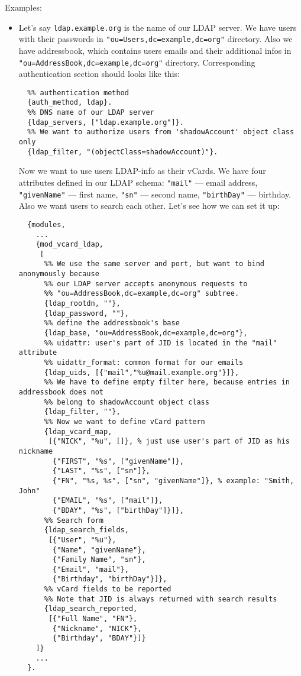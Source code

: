 \documentclass[a4paper,10pt]{book}
\newcommand{\term}[1]{\texttt{#1}}
\begin{document}
Examples:
\begin{itemize}
\item 

Let's say \term{ldap.example.org} is the name of our LDAP server. We have
users with their passwords in \term{"ou=Users,dc=example,dc=org"} directory.
Also we have addressbook, which contains users emails and their additional
infos in \term{"ou=AddressBook,dc=example,dc=org"} directory.  Corresponding
authentication section should looks like this:

\begin{verbatim}
  %% authentication method
  {auth_method, ldap}.
  %% DNS name of our LDAP server
  {ldap_servers, ["ldap.example.org"]}.
  %% We want to authorize users from 'shadowAccount' object class only
  {ldap_filter, "(objectClass=shadowAccount)"}.
\end{verbatim}

Now we want to use users LDAP-info as their vCards. We have four attributes
defined in our LDAP schema: \term{"mail"} --- email address, \term{"givenName"}
--- first name, \term{"sn"} --- second name, \term{"birthDay"} --- birthday.
Also we want users to search each other. Let's see how we can set it up:

\begin{verbatim}
  {modules,
    ...
    {mod_vcard_ldap,
     [
      %% We use the same server and port, but want to bind anonymously because
      %% our LDAP server accepts anonymous requests to
      %% "ou=AddressBook,dc=example,dc=org" subtree.
      {ldap_rootdn, ""},
      {ldap_password, ""},
      %% define the addressbook's base
      {ldap_base, "ou=AddressBook,dc=example,dc=org"},
      %% uidattr: user's part of JID is located in the "mail" attribute
      %% uidattr_format: common format for our emails
      {ldap_uids, [{"mail","%u@mail.example.org"}]},
      %% We have to define empty filter here, because entries in addressbook does not
      %% belong to shadowAccount object class
      {ldap_filter, ""},
      %% Now we want to define vCard pattern
      {ldap_vcard_map,
       [{"NICK", "%u", []}, % just use user's part of JID as his nickname
        {"FIRST", "%s", ["givenName"]},
        {"LAST", "%s", ["sn"]},
        {"FN", "%s, %s", ["sn", "givenName"]}, % example: "Smith, John"
        {"EMAIL", "%s", ["mail"]},
        {"BDAY", "%s", ["birthDay"]}]},
      %% Search form
      {ldap_search_fields,
       [{"User", "%u"},
        {"Name", "givenName"},
        {"Family Name", "sn"},
        {"Email", "mail"},
        {"Birthday", "birthDay"}]},
      %% vCard fields to be reported
      %% Note that JID is always returned with search results
      {ldap_search_reported,
       [{"Full Name", "FN"},
        {"Nickname", "NICK"},
        {"Birthday", "BDAY"}]}
    ]}
    ...
  }.
\end{verbatim}


\end{itemize}
\end{document}
